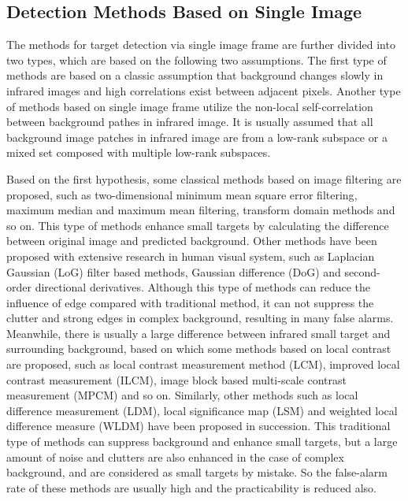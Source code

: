 \documentclass[journal]{IEEEtran}
\begin{document}
\subsection{Detection Methods Based on Single Image}
The methods for target detection via single image frame are further divided into two types, which are based on the following two assumptions. The first type of methods are based on a classic assumption that background changes slowly in infrared images and high correlations exist between adjacent pixels. Another type of methods based on single image frame utilize the non-local self-correlation between background pathes in infrared image. It is usually assumed that all background image patches in infrared image are from a low-rank subspace or a mixed set composed with multiple low-rank subspaces\cite{liu2013robust}.

Based on the first hypothesis, some classical methods based on image filtering are proposed, such as two-dimensional minimum mean square error filtering\cite{hadhoud1988two}, maximum median and maximum mean filtering\cite{deshpande1999max}, transform domain methods \cite{davidson2002wavelet,peng2004dim} and so on. This type of methods enhance small targets by calculating the difference between original image and predicted background. Other methods have been proposed with extensive research in human visual system, such as Laplacian Gaussian (LoG) filter based methods\cite{kim2009small}, Gaussian difference (DoG)\cite{wang2012infrared} and second-order directional derivatives\cite{qi2013robust}. Although this type of methods can reduce the influence of edge compared with traditional method, it can not suppress the clutter and strong edges in complex background, resulting in many false alarms. Meanwhile, there is usually a large difference between infrared small target and surrounding background, based on which some methods based on local contrast are proposed, such as local contrast measurement method (LCM)\cite{chen2014local}, improved local contrast measurement (ILCM)\cite{han2014robust}, image block based multi-scale contrast measurement (MPCM)\cite{wei2016multiscale} and so on. Similarly, other methods such as local difference measurement (LDM)\cite{deng2017entropy}, local significance map (LSM)\cite{chen2016efficient} and weighted local difference measure (WLDM)\cite{deng2016small} have been proposed in succession. This traditional type of methods can suppress background and enhance small targets, but a large amount of noise and clutters are also enhanced in the case of complex background, and are considered as small targets by mistake. So the false-alarm rate of these methods are usually high and the practicability is reduced also.
\end{document}
